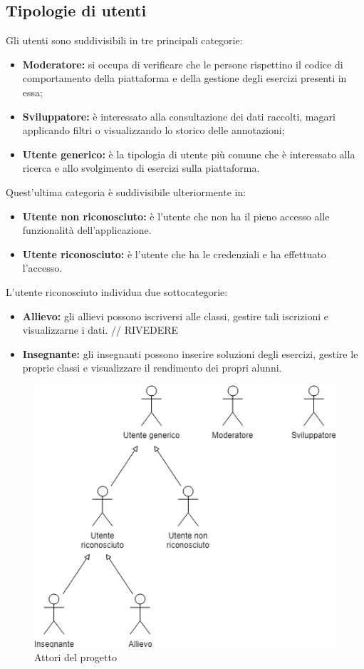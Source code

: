 \subsection{Tipologie di utenti}
Gli utenti sono suddivisibili in tre principali categorie: 
\begin{itemize}
	\item \textbf{Moderatore:} si occupa di verificare che le persone rispettino il codice di comportamento della piattaforma e della gestione degli esercizi presenti in essa;
	\item \textbf{Sviluppatore:} è interessato alla consultazione dei dati raccolti, magari applicando filtri o visualizzando lo storico delle annotazioni;
	\item \textbf{Utente generico:} è la tipologia di utente più comune che è interessato alla ricerca e allo svolgimento di esercizi sulla piattaforma.
\end{itemize}

Quest'ultima categoria è suddivisibile ulteriormente in:
\begin{itemize}
	\item \textbf{Utente non riconosciuto:} è l'utente che non ha il pieno accesso alle funzionalità dell'applicazione.
	\item \textbf{Utente riconosciuto:} è l'utente che ha le credenziali e ha effettuato l'accesso.
\end{itemize}

L'utente riconosciuto individua due sottocategorie:
\begin{itemize}
	\item \textbf{Allievo:} gli allievi possono iscriversi alle classi, gestire tali iscrizioni e visualizzarne i dati. // RIVEDERE
	\item \textbf{Insegnante:} gli insegnanti possono inserire soluzioni degli esercizi, gestire le proprie classi e visualizzare il rendimento dei propri alunni.
\end{itemize}
\begin{figure}[h]
			\centering
			\includegraphics[scale=0.7]{images/attori.png}
			\caption{Attori del progetto}
		\end{figure}